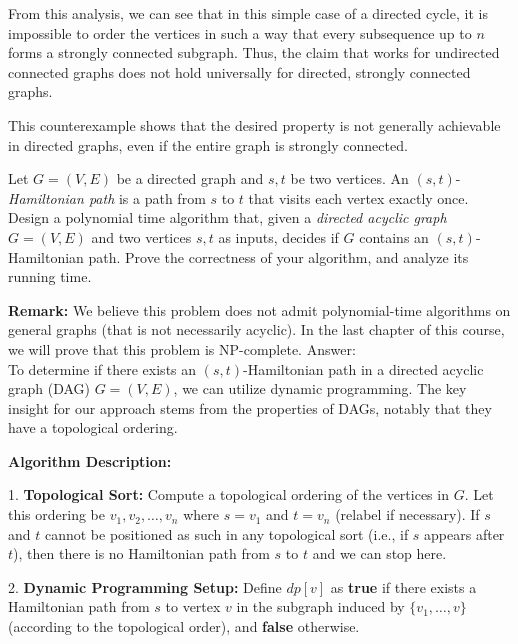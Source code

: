 \documentclass{oxmathproblems}
\begin{document}
\begin{questions}
\begin{parts}
From this analysis, we can see that in this simple case of a directed cycle, it is impossible to order the vertices in such a way that every subsequence up to $n$ forms a strongly connected subgraph. Thus, the claim that works for undirected connected graphs does not hold universally for directed, strongly connected graphs.

This counterexample shows that the desired property is not generally achievable in directed graphs, even if the entire graph is strongly connected.
\end{parts}

\miquestion[25]
Let $G=(V,E)$ be a directed graph and $s,t$ be two vertices.
An $(s,t)$-\emph{Hamiltonian path} is a path from $s$ to $t$ that visits each vertex exactly once.
Design a polynomial time algorithm that, given a \emph{directed acyclic graph} $G=(V,E)$ and two vertices $s,t$ as inputs, decides if $G$ contains an $(s,t)$-Hamiltonian path.
Prove the correctness of your algorithm, and analyze its running time.

\noindent\textbf{Remark: }We believe this problem does not admit polynomial-time algorithms on general graphs (that is not necessarily acyclic). In the last chapter of this course, we will prove that this problem is NP-complete.
\newpage
Answer:\\
To determine if there exists an $(s,t)$-Hamiltonian path in a directed acyclic graph (DAG) $G = (V, E)$, we can utilize dynamic programming. The key insight for our approach stems from the properties of DAGs, notably that they have a topological ordering. 

\textbf{Algorithm Description:}

1. \textbf{Topological Sort:} 
   Compute a topological ordering of the vertices in $G$. Let this ordering be $v_1, v_2, \dots, v_n$ where $s = v_1$ and $t = v_n$ (relabel if necessary). 
   If $s$ and $t$ cannot be positioned as such in any topological sort (i.e., if $s$ appears after $t$), then there is no Hamiltonian path from $s$ to $t$ and we can stop here.

2. \textbf{Dynamic Programming Setup:}
   Define $dp[v]$ as \textbf{true} if there exists a Hamiltonian path from $s$ to vertex $v$ in the subgraph induced by $\{v_1, \dots, v\}$ (according to the topological order), and \textbf{false} otherwise.


\end{questions}
\end{document}
